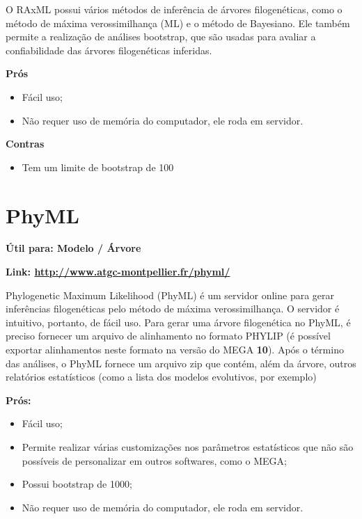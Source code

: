 \documentclass[
  letterpaper,
  DIV=11,
  numbers=noendperiod]{scrreprt}
\providecommand{\tightlist}{%
  \setlength{\itemsep}{0pt}\setlength{\parskip}{0pt}}\usepackage{longtable,booktabs,array}
\begin{document}
O RAxML possui vários métodos de inferência de árvores filogenéticas,
como o método de máxima verossimilhança (ML) e o método de Bayesiano.
Ele também permite a realização de análises bootstrap, que são usadas
para avaliar a confiabilidade das árvores filogenéticas inferidas.

\textbf{Prós}

\begin{itemize}
\item
  Fácil uso;
\item
  Não requer uso de memória do computador, ele roda em servidor.
\end{itemize}

\textbf{Contras}

\begin{itemize}
\tightlist
\item
  Tem um limite de bootstrap de 100
\end{itemize}

\hypertarget{phyml}{%
\section{PhyML}\label{phyml}}

\textbf{Útil para: {Modelo} / {Árvore}}

\textbf{Link: \url{http://www.atgc-montpellier.fr/phyml/}}

Phylogenetic Maximum Likelihood (PhyML) é um servidor online para gerar
inferências filogenéticas pelo método de máxima verossimilhança. O
servidor é intuitivo, portanto, de fácil uso. Para gerar uma árvore
filogenética no PhyML, é preciso fornecer um arquivo de alinhamento no
formato PHYLIP (é possível exportar alinhamentos neste formato na versão
do MEGA \textbf{10}). Após o término das análises, o PhyML fornece um
arquivo zip que contém, além da árvore, outros relatórios estatísticos
(como a lista dos modelos evolutivos, por exemplo)

\textbf{Prós:}

\begin{itemize}
\item
  Fácil uso;
\item
  Permite realizar várias customizações nos parâmetros estatísticos que
  não são possíveis de personalizar em outros softwares, como o MEGA;
\item
  Possui bootstrap de 1000;
\item
  Não requer uso de memória do computador, ele roda em servidor.
\end{itemize}
\end{document}
